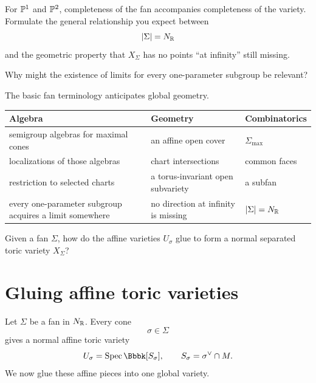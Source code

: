 \begin{prediction}
For \(\mathbb{P}^1\) and \(\mathbb{P}^2\), completeness of the fan accompanies
completeness of the variety. Formulate the general relationship you
expect between
\[
|\Sigma|=N_{\mathbb{R}}
\]
and the geometric property that \(X_\Sigma\) has no points “at
infinity” still missing.

Why might the existence of limits for every one-parameter subgroup be
relevant?
\end{prediction}

\begin{threedictionaries}
The basic fan terminology anticipates global geometry.

\medskip

\begin{center}
\small
\begin{tabularx}{\linewidth}{@{}
  >{\raggedright\arraybackslash}X
  >{\raggedright\arraybackslash}X
  >{\raggedright\arraybackslash}X@{}}
\toprule
\textbf{Algebra}
&
\textbf{Geometry}
&
\textbf{Combinatorics}
\\
\midrule
semigroup algebras for maximal cones
&
an affine open cover
&
\(\Sigma_{\max}\)
\\[1mm]
localizations of those algebras
&
chart intersections
&
common faces
\\[1mm]
restriction to selected charts
&
a torus-invariant open subvariety
&
a subfan
\\[1mm]
every one-parameter subgroup acquires a limit somewhere
&
no direction at infinity is missing
&
\(|\Sigma|=N_{\mathbb{R}}\)
\\
\bottomrule
\end{tabularx}
\end{center}
\end{threedictionaries}

\begin{guidingquestion}
Given a fan \(\Sigma\), how do the affine varieties \(U_\sigma\) glue
to form a normal separated toric variety \(X_\Sigma\)?
\end{guidingquestion}


\section{Gluing affine toric varieties}
\label{sec:gluing-affine-toric-varieties}

Let \(\Sigma\) be a fan in \(N_{\mathbb{R}}\). Every cone
\[
\sigma\in\Sigma
\]
gives a normal affine toric variety
\[
U_\sigma
=
\Spec\Bbbk[S_\sigma],
\qquad
S_\sigma=\sigma^\vee\cap M.
\]
We now glue these affine pieces into one global variety.

